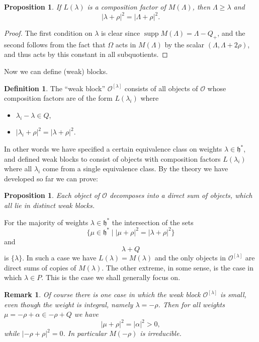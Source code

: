 \documentclass[12pt]{article}
\theoremstyle{plain}
\newtheorem{prop}[thm]{Proposition}
\newtheorem{rem}[thm]{Remark}
\theoremstyle{definition}
\newtheorem{defn}{Definition}[section]
\numberwithin{equation}{section}
\DeclareMathOperator{\supp}{supp}
\newcommand{\al}{\alpha}
\newcommand{\la}{\lambda}
\newcommand{\La}{\Lambda}
\newcommand{\h}{\mathfrak{h}}
\newcommand{\OO}{\mathcal{O}}
\begin{document}
\begin{prop}%
If $L(\la)$ is a composition factor of $M(\Lambda)$, then $\La \geq \la$ and
\[
|\la + \rho|^2 = |\La+\rho|^2.
\]
\end{prop}

\begin{proof}
The first condition on $\la$ is clear since $\supp M(\La) = \La - Q_+$, and the second follows from the fact that $\Omega$ acts in $M(\La)$ by the scalar $(\La, \La+2\rho)$, and thus acts by this constant in all subquotients.
\end{proof}

Now we can define (weak) blocks.
\begin{defn}
The ``weak block'' $\OO^{[\la]}$ consists of all objects of $\OO$ whose composition factors are of the form $L(\la_i)$ where
\begin{itemize}
\item $\la_i - \la \in Q$,

\item $|\la_i+\rho|^2 = |\la+\rho|^2$.
\end{itemize}
\end{defn}
In other words we have specified a certain equivalence class on weights $\la \in \h^*$, and defined weak blocks to consist of objects with composition factors $L(\la_i)$ where all $\la_i$ come from a single equivalence class. By the theory we have developed so far we can prove:
\begin{prop}
Each object of $\OO$ decomposes into a direct sum of objects, which all lie in distinct weak blocks.
\end{prop}

For the majority of weights $\la \in \h^*$ the intersection of the sets
\[
\{\mu \in \h^* \mid |\mu+\rho|^2 = |\la+\rho|^2 \}
\]
and
\[
\la + Q
\]
is $\{\la\}$. In such a case we have $L(\la) = M(\la)$ and the only objects in $\OO^{[\la]}$ are direct sums of copies of $M(\la)$. The other extreme, in some sense, is the case in which $\la \in P$. This is the case we shall generally focus on.

\begin{rem}
Of course there is one case in which the weak block $\OO^{[\la]}$ is small, even though the weight is integral, namely $\la = -\rho$. Then for all weights $\mu = -\rho+\al \in -\rho+Q$ we have
\[
|\mu+\rho|^2 = |\al|^2 > 0,
\]
while $|-\rho+\rho|^2 = 0$. In particular $M(-\rho)$ is irreducible. %
\end{rem}
\end{document}
